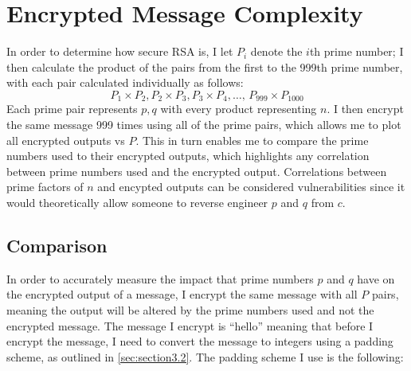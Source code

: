\section{Encrypted Message Complexity}\label{sec:section6}
In order to determine how secure RSA is, I let $P_i$ denote the $i$th prime number; I then calculate the product of the pairs from the first to the 999th prime number, with each pair calculated individually as follows:
$$
P_1 \times P_2, P_2 \times P_3, P_3 \times P_4, \ldots, \,
P_{999} \times P_{1000}
$$
Each prime pair represents $p,q$ with every product representing $n$. I then encrypt the same message 999 times using all of the prime pairs, which allows me to plot all encrypted outputs vs $P$. This in turn enables me to compare the prime numbers used to their encrypted outputs, which highlights any correlation between prime numbers used and the encrypted output. Correlations between prime factors of $n$ and encypted outputs can be considered vulnerabilities since it would theoretically allow someone to reverse engineer $p$ and $q$ from $c$.

\subsection{Comparison}\label{sec:section6.1} 
In order to accurately measure the impact that prime numbers $p$ and $q$ have on the encrypted output of a message, I encrypt the same message with all $P$ pairs, meaning the output will be altered by the prime numbers used and not the encrypted message. The message I encrypt is “hello” meaning that before I encrypt the message, I need to convert the message to integers using a padding scheme, as outlined in \autoref{sec:section3.2}. The padding scheme I use is the following:

